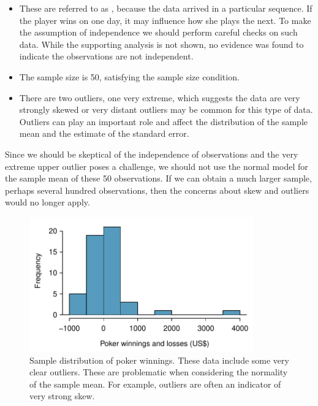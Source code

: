 \begin{spacing}{1.5}
\begin{example}
\begin{itemize}
\setlength{\itemsep}{0mm}
\item[(1)] These are referred to as , because the data arrived in a particular sequence. If the player wins on one day, it may influence how she plays the next. To make the assumption of independence we should perform careful checks on such data. While the supporting analysis is not shown, no evidence was found to indicate the observations are not independent.
\item[(2)] The sample size is 50, satisfying the sample size condition.
\item[(3)] There are two outliers, one very extreme, which suggests the data are very strongly skewed or very distant outliers may be common for this type of data. Outliers can play an important role and affect the distribution of the sample mean and the estimate of the standard error.
\end{itemize}
Since we should be skeptical of the independence of observations and the very extreme upper outlier poses a challenge, we should not use the normal model for the sample mean of these 50 observations. If we can obtain a much larger sample, perhaps several hundred observations, then the concerns about skew and outliers would no longer apply.
\end{example}

\begin{figure}[ht]
   \centering
   \includegraphics[height=58mm]{ch_inference_foundations_oi_biostat/figures/pokerProfitsCanApplyNormalToSampMean/pokerProfitsCanApplyNormalToSampMean}
   \caption{Sample distribution of poker winnings. These data include some very clear outliers. These are problematic when considering the normality of the sample mean. For example, outliers are often an indicator of very strong skew.}
   \label{pokerProfitsCanApplyNormalToSampMean}
\end{figure}


\end{spacing}
